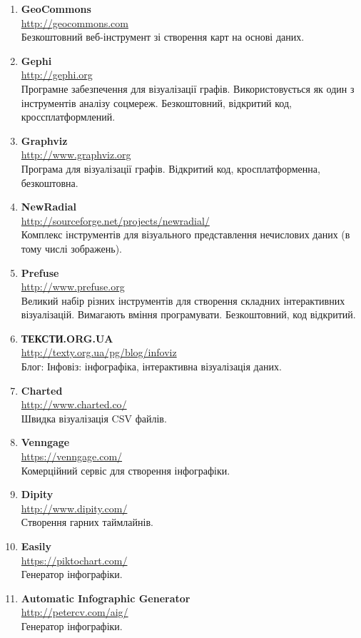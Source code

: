 \begin{enumerate}
    \item \textbf{GeoCommons} \\
    \url{http://geocommons.com} \\
    Безкоштовний веб-інструмент зі створення карт на основі даних.

    \item \textbf{Gephi} \\
    \url{http://gephi.org} \\
    Програмне забезпечення для візуалізації графів. Використовується як один з інструментів аналізу соцмереж. Безкоштовний, відкритий код, кроссплатформлений.

    \item \textbf{Graphviz} \\
    \url{http://www.graphviz.org} \\
    Програма для візуалізації графів. Відкритий код, кросплатформенна, безкоштовна.

    \item \textbf{NewRadial} \\
    \url{http://sourceforge.net/projects/newradial/} \\
    Комплекс інструментів для візуального представлення нечислових даних (в тому числі зображень).

    \item \textbf{Prefuse} \\
    \url{http://www.prefuse.org} \\
    Великий набір різних інструментів для створення складних інтерактивних візуалізацій. Вимагають вміння програмувати. Безкоштовний, код відкритий.

    \item \textbf{ТЕКСТИ.ORG.UA} \\
    \url{http://texty.org.ua/pg/blog/infoviz} \\
    Блог: Інфовіз: інфографіка, інтерактивна візуалізація даних.

    \item \textbf{Charted} \\
    \url{http://www.charted.co/} \\
    Швидка візуалізація CSV файлів.

    \item \textbf{Venngage} \\
    \url{https://venngage.com/} \\
    Комерційний сервіс для створення інфографіки.

    \item \textbf{Dipity} \\
    \url{http://www.dipity.com/} \\
    Створення гарних таймлайнів.

    \item \textbf{Easily} \\
    \url{https://piktochart.com/} \\
    Генератор інфографіки.

    \item \textbf{Automatic Infographic Generator} \\
    \url{http://petercv.com/aig/} \\
    Генератор інфографіки.
\end{enumerate}